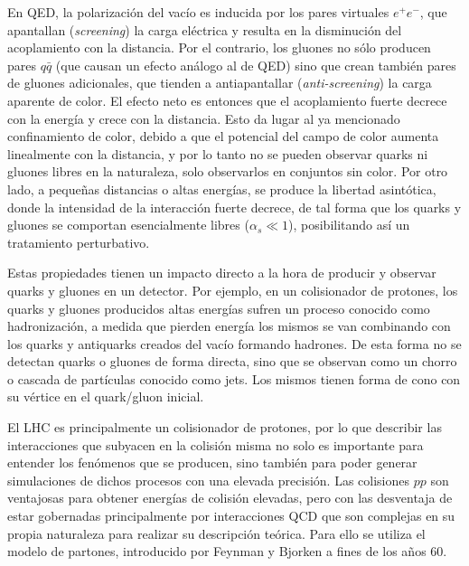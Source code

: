 En QED, la polarización del vacío es inducida por los
pares virtuales $e^{+}e^{-}$, que apantallan (\textit{screening}) la carga eléctrica y resulta en la disminución del
acoplamiento con la distancia. Por el contrario, los gluones no sólo producen pares $q\bar{q}$ (que
causan un efecto análogo al de QED) sino que crean también pares de gluones adicionales,
que tienden a antiapantallar (\textit{anti-screening}) la carga aparente de color. El efecto neto es entonces que
el acoplamiento fuerte decrece con la energía y crece con la distancia. Esto da lugar al ya mencionado confinamiento de color, debido a que el potencial del campo de color aumenta linealmente con la distancia, y por lo tanto no se pueden observar quarks ni gluones libres en la naturaleza, solo observarlos en conjuntos sin color. Por otro lado, a pequeñas distancias o altas energías, se produce la libertad asintótica, donde la intensidad de
la interacción fuerte decrece, de tal forma que los quarks y gluones se comportan
esencialmente libres ($\alpha_s \ll 1$), posibilitando así un tratamiento perturbativo. 

Estas propiedades tienen un impacto directo a la hora de producir y observar quarks y gluones en un detector. Por ejemplo, en un colisionador de protones, los quarks y
gluones producidos altas energías sufren un proceso conocido como hadronización,
a medida que pierden energía los mismos se van combinando con los quarks y antiquarks creados del vacío formando hadrones. De esta forma no se detectan quarks o gluones de forma directa, sino que se observan como un chorro o cascada de partículas conocido como jets. Los mismos tienen forma de cono con su vértice en el quark/gluon inicial.




El LHC es principalmente un colisionador de protones, por lo que describir las interacciones que subyacen en la colisión misma no solo es importante para entender los fenómenos que se producen, sino también para poder generar simulaciones de dichos procesos con una elevada precisión. Las colisiones $pp$ son ventajosas para obtener energías de colisión elevadas, pero con las desventaja de estar gobernadas principalmente por interacciones QCD que son complejas en su propia naturaleza para realizar su descripción teórica. Para ello se utiliza el modelo de partones, introducido por Feynman \cite{feynman} y Bjorken \cite{bjorken} a fines de los años 60. 

